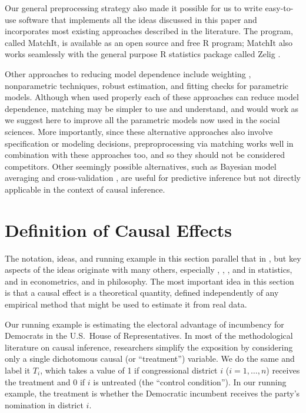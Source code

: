 \documentclass[11pt,titlepage]{article}
\begin{document}
Our general preprocessing strategy also made it possible for us to
write easy-to-use software that implements all the ideas discussed in
this paper and incorporates most existing approaches described in the
literature.  The program, called MatchIt, is available as an open
source and free R program; MatchIt also works seamlessly with the
general purpose R statistics package called Zelig \citep{ImaKinLau06}.

Other approaches to reducing model dependence include weighting
\citep{RobRot03, HirImbRid03}, nonparametric techniques, robust
estimation, and fitting checks for parametric models.  Although when
used properly each of these approaches can reduce model dependence,
matching may be simpler to use and understand, and would work as we
suggest here to improve all the parametric models now used in the
social sciences.  More importantly, since these alternative approaches
also involve specification or modeling decisions, preproprocessing via
matching works well in combination with these approaches too, and so
they should not be considered competitors.  Other seemingly possible
alternatives, such as Bayesian model averaging
\citep{HoeMadRaf99,ImaKin04} and cross-validation \citep{BlaSmi04},
are useful for predictive inference but not directly applicable in the
context of causal inference.

\section{Definition of Causal Effects}

The notation, ideas, and running example in this section parallel that
in \citet[][Section 3.1.1]{KinKeoVer94}, but key aspects of the ideas
originate with many others, especially \citet{Neyman23b},
\citet{Fisher35}, \citet{Cox58}, \citet{Rubin74} and \citet{Holland86}
in statistics, \citet{Roy51} and \citet{Quandt72} in econometrics, and
\citet{Lewis73} in philosophy.  The most important idea in this
section is that a causal effect is a theoretical quantity, defined
independently of any empirical method that might be used to estimate
it from real data.

Our running example is estimating the electoral advantage of
incumbency for Democrats in the U.S.\ House of Representatives.  In
most of the methodological literature on causal inference, researchers
simplify the exposition by considering only a single dichotomous
causal (or ``treatment'') variable.  We do the same and label it
$T_i$, which takes a value of 1 if congressional district $i$
($i=1,\dots,n$) receives the treatment and 0 if $i$ is untreated (the
``control condition'').  In our running example, the treatment is
whether the Democratic incumbent receives the party's nomination in
district $i$.
\end{document}
